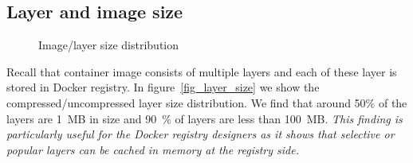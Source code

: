 \subsection{Layer and image size}
\begin{figure}[!t]
	\centering

	\caption{Image/layer size distribution}
	\label{fig:image-layer-size}
\end{figure}
Recall that container image consists of multiple layers and each of these layer
is stored in Docker registry. In figure~\ref{fig_layer_size} we show the compressed/uncompressed layer
size distribution. We find that around 50\% of the layers are 1~MB in size and
90~\% of layers are less than 100~MB. \emph{This finding is particularly useful for
the Docker registry designers as it shows that selective or popular layers can
be cached in memory at the registry side.}

